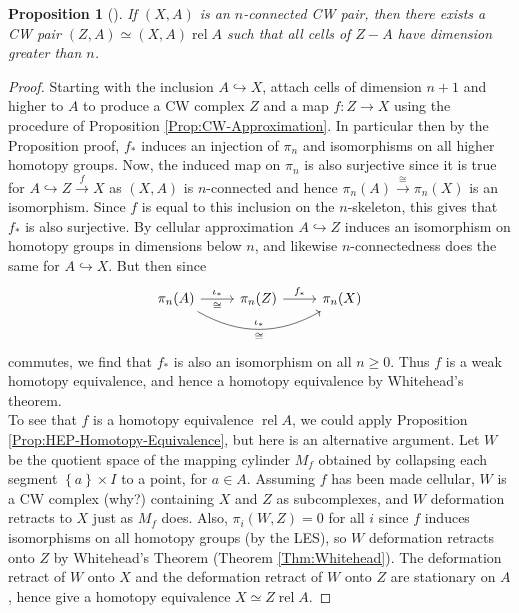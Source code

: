 \documentclass[reqno]{amsart}
\newtheorem{proposition}[theorem]{Proposition}
\theoremstyle{definition}
\theoremstyle{remark}
\DeclareMathOperator{\rel}{rel}
\begin{document}
\begin{proposition}[]
    If $\left( X,A \right) $ is an $n$-connected
    CW pair, then there exists a CW pair
    $\left( Z,A \right) \simeq \left( X,A \right) \rel A$ 
    such that all cells of $Z - A$ have dimension greater
    than $n$.
\end{proposition}

\begin{proof}
    Starting with the inclusion
    $A \hookrightarrow X$, attach cells of
    dimension $n+1$ and higher to
    $A$ to produce a CW complex $Z$ and
    a map $f \colon Z \to X$ using the
    procedure of Proposition \ref{Prop:CW-Approximation}.
    In particular then
    by the Proposition proof,
    $f_*$ induces an injection of
    $\pi_n$ and isomorphisms on all higher homotopy groups.
    Now, the induced map on $\pi_n$ is also
    surjective since it is true for
    $A \hookrightarrow Z \stackrel{f}{\to} X$ 
    as $\left( X,A \right) $ is $n$-connected and hence
    $\pi_n (A) \stackrel{\cong}{\to}  \pi_n(X)$ is an isomorphism.
    Since $f$ is equal to this inclusion on the
    $n$-skeleton, this gives that $f_*$ is also surjective.
    By cellular approximation
    $A \hookrightarrow Z$ induces an isomorphism
    on homotopy groups in dimensions below $n$, and
    likewise $n$-connectedness does the same for
    $A \hookrightarrow X$. But then since
    \begin{equation*}
    \begin{tikzcd}
        \pi_n (A) \ar[rr, bend right, "\iota_*",
        "\cong"'] 
        \ar[r, "\iota_*", "\cong"'] & 
        \pi_n (Z) \ar[r,"f_*"] & 
        \pi_n (X)
    \end{tikzcd}
    \end{equation*}
    commutes, we find that $f_*$ is also an
    isomorphism on all $n\ge 0$.
    Thus $f$ is a weak homotopy equivalence, and hence
    a homotopy equivalence by Whitehead's theorem.\\

    To see that $f$ is a homotopy equivalence
    $\rel A$, we could apply Proposition 
    \ref{Prop:HEP-Homotopy-Equivalence}, but
    here is an alternative argument. Let
    $W$ be the quotient space of the mapping cylinder
    $M_f$ obtained by collapsing each segment
    $\left\{ a \right\} \times I$ to a point, for
    $a \in A$. Assuming $f$ has been made cellular,
    $W$ is a CW complex (why?) containing $X$ and $Z$ as
    subcomplexes, and $W$ deformation retracts
    to $X$ just as $M_f$ does. Also,
    $\pi_i \left( W,Z \right) = 0$ for all
    $i$ since $f$ induces isomorphisms on all
    homotopy groups (by the LES), so $W$ deformation retracts
    onto $Z$ by Whitehead's Theorem (Theorem \ref{Thm:Whitehead}).
    The deformation retract of $W$ onto $X$ and the
    deformation retract of $W$ onto $Z$ are stationary
    on $A$, hence give a homotopy equivalence
    $X \simeq Z \rel A$.
\end{proof}
\end{document}
